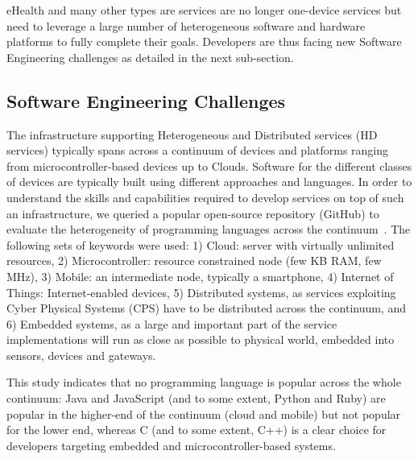 eHealth and many other types are services are no longer one-device services but need to leverage a large number of heterogeneous software and hardware platforms to fully complete their goals. Developers are thus facing new Software Engineering challenges as detailed in the next sub-section. 

\subsection{Software Engineering Challenges}

The infrastructure supporting Heterogeneous and Distributed services (HD services) typically spans across a continuum of devices and platforms ranging from microcontroller-based devices up to Clouds. Software for the different classes of devices are typically built using different approaches and languages. In order to understand the skills and capabilities required to develop services on top of such an infrastructure, we queried a popular open-source repository (GitHub) to evaluate the heterogeneity of programming languages across the continuum~\cite{DBLP:conf/icse/MorinFB15}. The following sets of keywords were used: 1) Cloud: server with virtually unlimited resources, 2) Microcontroller: resource constrained node (few KB RAM, few MHz), 3) Mobile: an intermediate node, typically a smartphone, 4) Internet of Things: Internet-enabled devices, 5) Distributed systems, as services exploiting Cyber Physical Systems (CPS) have to be distributed across the continuum, and 6) Embedded systems, as a large and important part of the service implementations will run as close as possible to physical world, embedded into sensors, devices and gateways. 

This study indicates that no programming language is popular across the whole continuum: Java and JavaScript (and to some extent, Python and Ruby) are popular in the higher-end of the continuum (cloud and mobile) but not popular for the lower end, whereas C (and to some extent, C++) is a clear choice for developers targeting embedded and microcontroller-based systems.%

